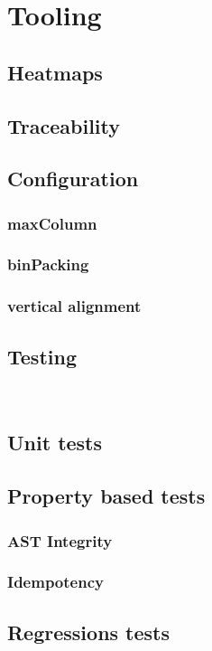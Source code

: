 \section{Tooling}\label{sec:tooling}
\subsection{Heatmaps}
\subsection{Traceability}\label{sec:line}
\subsection{Configuration}
\subsubsection{maxColumn}
\subsubsection{binPacking}
\subsubsection{vertical alignment}
\subsection{Testing}~\label{sec:testing}
\subsection{Unit tests}
\subsection{Property based tests}
\subsubsection{AST Integrity}
\subsubsection{Idempotency}
\subsection{Regressions tests}
